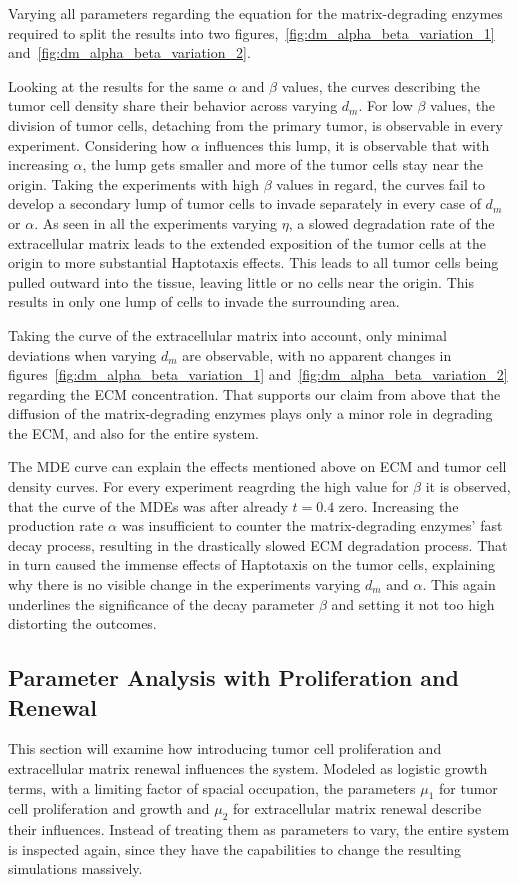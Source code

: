 Varying all parameters regarding the equation for the matrix-degrading enzymes required to split the results into two figures,~\ref{fig:dm_alpha_beta_variation_1} and~\ref{fig:dm_alpha_beta_variation_2}.

Looking at the results for the same $\alpha$ and $\beta$ values, the curves describing the tumor cell density share their behavior across varying $d_m$. For low $\beta$ values, the division of tumor cells, detaching from the primary tumor, is observable in every experiment. Considering how $\alpha$ influences this lump, it is observable that with increasing $\alpha$, the lump gets smaller and more of the tumor cells stay near the origin. Taking the experiments with high $\beta$ values in regard, the curves fail to develop a secondary lump of tumor cells to invade separately in every case of $d_m$ or $\alpha$. As seen in all the experiments varying $\eta$, a slowed degradation rate of the extracellular matrix leads to the extended exposition of the tumor cells at the origin to more substantial Haptotaxis effects. This leads to all tumor cells being pulled outward into the tissue, leaving little or no cells near the origin. This results in only one lump of cells to invade the surrounding area.

Taking the curve of the extracellular matrix into account, only minimal deviations when varying $d_m$ are observable, with no apparent changes in figures~\ref{fig:dm_alpha_beta_variation_1} and~\ref{fig:dm_alpha_beta_variation_2} regarding the ECM concentration. That supports our claim from above that the diffusion of the matrix-degrading enzymes plays only a minor role in degrading the ECM, and also for the entire system.

The MDE curve can explain the effects mentioned above on ECM and tumor cell density curves. For every experiment reagrding the high value for $\beta$ it is observed, that the curve of the MDEs was after already $t=0.4$ zero. Increasing the production rate $\alpha$ was insufficient to counter the matrix-degrading enzymes' fast decay process, resulting in the drastically slowed ECM degradation process. That in turn caused the immense effects of Haptotaxis on the tumor cells, explaining why there is no visible change in the experiments varying $d_m$ and $\alpha$. This again underlines the significance of the decay parameter $\beta$ and setting it not too high distorting the outcomes. 


\subsection{Parameter Analysis with Proliferation and Renewal}
This section will examine how introducing tumor cell proliferation and extracellular matrix renewal influences the system. Modeled as logistic growth terms, with a limiting factor of spacial occupation, the parameters $\mu_1$ for tumor cell proliferation and growth and $\mu_2$ for extracellular matrix renewal describe their influences. Instead of treating them as parameters to vary, the entire system is inspected again, since they have the capabilities to change the resulting simulations massively.

